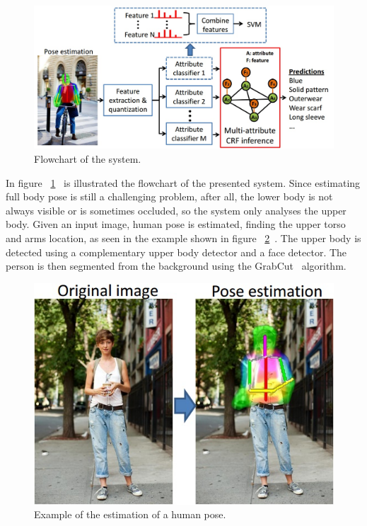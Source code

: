\documentclass[titlepage,12pt,a4paper,times]{book}
\begin{document}
\begin{figure}[!h]
\centering
\includegraphics[scale=0.5]{images/2_3_fig2.jpg}
\caption{Flowchart of the system.}
\label{fig:fc}
\end{figure}
\FloatBarrier

In figure ~\ref{fig:fc}~\citep{2} is illustrated the flowchart of the presented
system. Since estimating full body pose is still a challenging problem, after
all, the lower body is not always visible or is sometimes occluded, so the
system only analyses the upper body. Given an input image, human
pose is estimated, finding the upper torso and arms location, as seen in the
example shown in figure ~\ref{fig:eehp}~\citep{2}. The upper body is detected
using a complementary upper body detector and a face detector. The person is
then segmented from the background using the GrabCut~\citep{7} algorithm.

\begin{figure}[!h]
\centering
\includegraphics[scale=0.5]{images/2_3_fig1.jpg}
\caption{Example of the estimation of a human pose.}
\label{fig:eehp}
\end{figure}
\FloatBarrier
\end{document}
